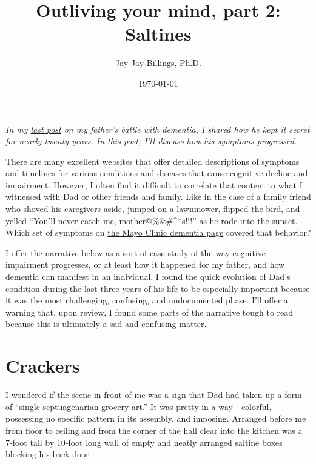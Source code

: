 \documentclass{article}
\title{Outliving your mind, part 2: Saltines}
\author{Jay Jay Billings, Ph.D.}
\date{\today}
\begin{document}
\maketitle

\textit{In my \href{https://jayjaybillings.com/2023/07/06/outliving-your-mind-part-1-the-secret/}{last post} on my father's battle with dementia, I shared how he kept it secret for nearly twenty years. In this post, I'll discuss how his symptoms progressed.}

There are many excellent websites that offer detailed descriptions of symptoms and timelines for various conditions and diseases that cause cognitive decline and impairment. However, I often find it difficult to correlate that content to what I witnessed with Dad or other friends and family. Like in the case of a family friend who shoved his caregivers aside, jumped on a lawnmower, flipped the bird, and yelled ``You'll never catch me, mother@\%\&\#\^\@*s!!!'' as he rode into the sunset. Which set of symptoms on \href{https://www.mayoclinic.org/diseases-conditions/dementia/symptoms-causes/syc-20352013}{the Mayo Clinic dementia page} covered that behavior?

I offer the narrative below as a sort of case study of the way cognitive impairment progresses, or at least how it happened for my father, and how dementia can manifest in an individual. I found the quick evolution of Dad's condition during the last three years of his life to be especially important because it was the most challenging, confusing, and undocumented phase. I'll offer a warning that, upon review, I found some parts of the narrative tough to read because this is ultimately a sad and confusing matter. 

\section*{Crackers}

I wondered if the scene in front of me was a sign that Dad had taken up a form of ``single septuagenarian grocery art.'' It was pretty in a way - colorful, possessing no specific pattern in its assembly, and imposing. Arranged before me from floor to ceiling and from the corner of the hall clear into the kitchen was a 7-foot tall by 10-foot long wall of empty and neatly arranged saltine boxes blocking his back door.
\end{document}
